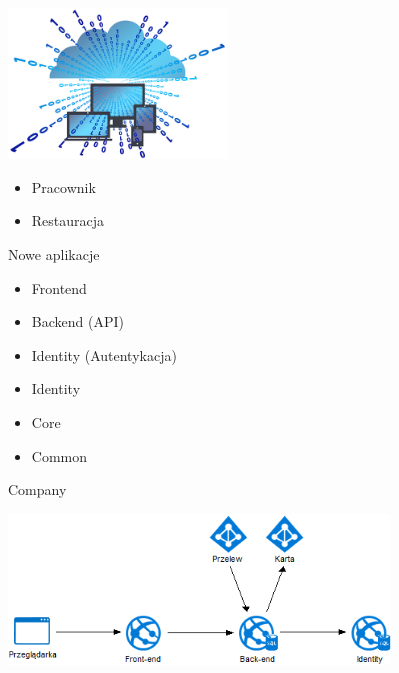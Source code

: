 \documentclass{beamer}
\begin{document}
\begin{frame}{}
	\begin{center}
		\includegraphics[height=4cm]{virtual1.png}
	\end{center}
\end{frame}

\begin{frame}{}
	\begin{huge}
		\begin{itemize}[<+->]
			\item Pracownik
			\item Restauracja
		\end{itemize}
	\end{huge}
\end{frame}

\begin{frame}{Nowe aplikacje}
	\begin{huge}
		\begin{itemize}
			\item Frontend
			\item Backend (API)
			\item Identity (Autentykacja)
		\end{itemize}
	\end{huge}
\end{frame}

\begin{frame}{}
	\begin{huge}
		\begin{itemize}[<+->]
			\item Identity
			\item Core
			\item Common
		\end{itemize}
	\end{huge}
\end{frame}

\begin{frame}{Company}
	\begin{center}
		\includegraphics[height=4cm]{architektura1.png}
	\end{center}
\end{frame}
\end{document}

